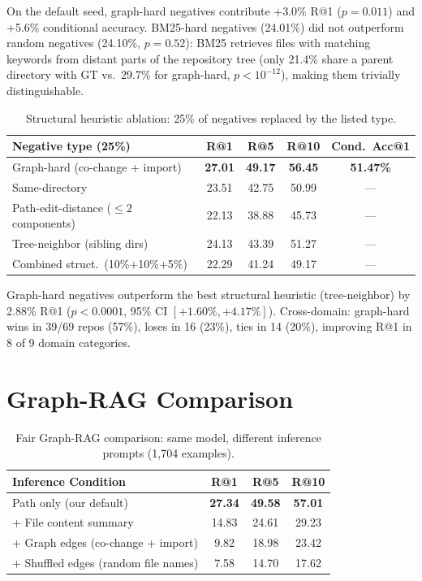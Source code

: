 \documentclass{article}
\begin{document}
On the default seed, graph-hard negatives contribute +3.0\% R@1 ($p = 0.011$) and +5.6\% conditional accuracy.
BM25-hard negatives (24.01\%) did not outperform random negatives (24.10\%, $p = 0.52$): BM25 retrieves files with matching keywords from distant parts of the repository tree (only 21.4\% share a parent directory with GT vs.\ 29.7\% for graph-hard, $p < 10^{-12}$), making them trivially distinguishable.

\begin{table}[h]
\centering
\caption{Structural heuristic ablation: 25\% of negatives replaced by the listed type.}
\label{tab:structural}
\small
\begin{tabular}{lcccc}
\toprule
\textbf{Negative type (25\%)} & \textbf{R@1} & \textbf{R@5} & \textbf{R@10} & \textbf{Cond.\ Acc@1} \\
\midrule
Graph-hard (co-change + import) & \textbf{27.01} & \textbf{49.17} & \textbf{56.45} & \textbf{51.47\%} \\
Same-directory & 23.51 & 42.75 & 50.99 & --- \\
Path-edit-distance ($\leq 2$ components) & 22.13 & 38.88 & 45.73 & --- \\
Tree-neighbor (sibling dirs) & 24.13 & 43.39 & 51.27 & --- \\
Combined struct.\ (10\%+10\%+5\%) & 22.29 & 41.24 & 49.17 & --- \\
\bottomrule
\end{tabular}
\end{table}

Graph-hard negatives outperform the best structural heuristic (tree-neighbor) by 2.88\% R@1 ($p < 0.0001$, 95\% CI $[{+}1.60\%, {+}4.17\%]$).
Cross-domain: graph-hard wins in 39/69 repos (57\%), loses in 16 (23\%), ties in 14 (20\%), improving R@1 in 8 of 9 domain categories.


\section{Graph-RAG Comparison}
\label{app:graphrag}

\begin{table}[h]
\centering
\caption{Fair Graph-RAG comparison: same model, different inference prompts (1,704 examples).}
\label{tab:graphrag}
\small
\begin{tabular}{lccc}
\toprule
\textbf{Inference Condition} & \textbf{R@1} & \textbf{R@5} & \textbf{R@10} \\
\midrule
Path only (our default) & \textbf{27.34} & \textbf{49.58} & \textbf{57.01} \\
+ File content summary & 14.83 & 24.61 & 29.23 \\
+ Graph edges (co-change + import) & 9.82 & 18.98 & 23.42 \\
+ Shuffled edges (random file names) & 7.58 & 14.70 & 17.62 \\
\bottomrule
\end{tabular}
\end{table}
\end{document}
